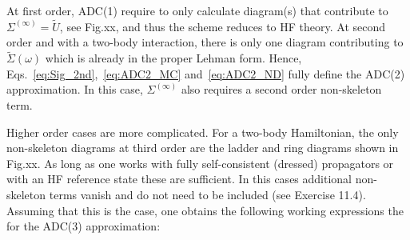 At first order, ADC(1) require to only calculate diagram(s) that contribute to $\Sigma^{(\infty)}=\tilde{U}$,
see Fig.xx, and thus the scheme reduces to HF theory.
At second order and with a two-body interaction, there is only one diagram contributing to $\tilde\Sigma(\omega)$
which is already in the proper Lehman form. Hence, Eqs.~\ref{eq:Sig_2nd},~\ref{eq:ADC2_MC} and~\ref{eq:ADC2_ND}
fully define the ADC(2) approximation. In this case, $\Sigma^{(\infty)}$ also requires a second order non-skeleton term.

Higher order cases are more complicated. For a two-body Hamiltonian, the only non-skeleton diagrams at third order
are the ladder and ring diagrams shown in Fig.xx.  As long as one works with fully self-consistent (dressed)
propagators or with an HF reference state these are sufficient. In this cases additional  non-skeleton terms vanish and
do not need to be included (see Exercise 11.4).
Assuming that this is the case, one obtains the following working expressions the for the ADC(3) approximation:
